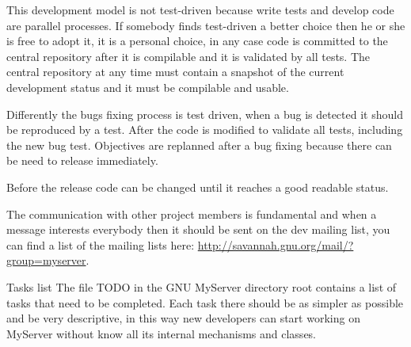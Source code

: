 \documentclass[12pt]{article}
\begin{document}
This development model is not test-driven because write tests and
develop code are parallel processes.
If somebody finds test-driven a better choice then he or she is free
to adopt it, it is a personal choice, in any case code is committed
to the central repository after it is compilable and it is validated
by all tests.
The central repository at any time must contain a snapshot of the
current development status and it must be compilable and usable.

Differently the bugs fixing process is test driven, when a bug is
detected it should be reproduced by a test.  After the code is
modified to validate all tests, including the new bug test.
Objectives are replanned after a bug fixing because there can be need
to release immediately.

Before the release code can be changed until it reaches a good
readable status.

The communication with other project members is fundamental and when a
message interests everybody then it should be sent on the dev mailing
list, you can find a list of the mailing lists here:
\url{http://savannah.gnu.org/mail/?group=myserver}.

\begin{section}{Tasks list}
The file TODO in the GNU MyServer directory root contains a list of
tasks that need to be completed.  Each task there should be as simpler
as possible and be very descriptive, in this way new developers can
start working on MyServer without know all its internal mechanisms and
classes.
\end{section}
\end{document}
